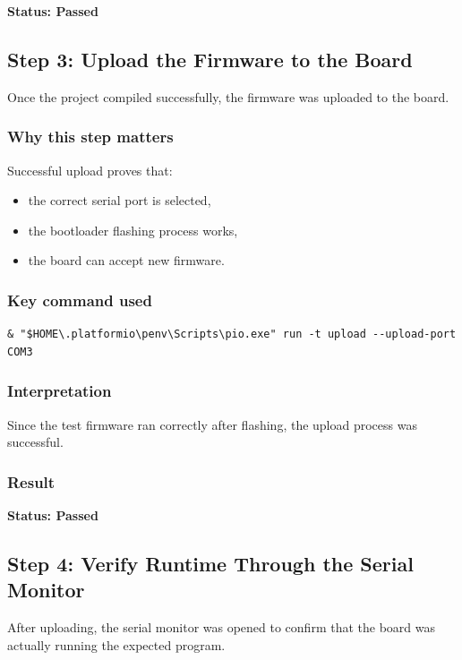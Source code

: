 \documentclass[12pt,a4paper]{article}
\begin{document}
\textbf{Status: Passed}

\subsection{Step 3: Upload the Firmware to the Board}

Once the project compiled successfully, the firmware was uploaded to the board.

\subsubsection*{Why this step matters}

Successful upload proves that:

\begin{itemize}
    \item the correct serial port is selected,
    \item the bootloader flashing process works,
    \item the board can accept new firmware.
\end{itemize}

\subsubsection*{Key command used}

\begin{lstlisting}
& "$HOME\.platformio\penv\Scripts\pio.exe" run -t upload --upload-port COM3
\end{lstlisting}

\subsubsection*{Interpretation}

Since the test firmware ran correctly after flashing, the upload process was
successful.

\subsubsection*{Result}

\textbf{Status: Passed}

\subsection{Step 4: Verify Runtime Through the Serial Monitor}

After uploading, the serial monitor was opened to confirm that the board was
actually running the expected program.
\end{document}
